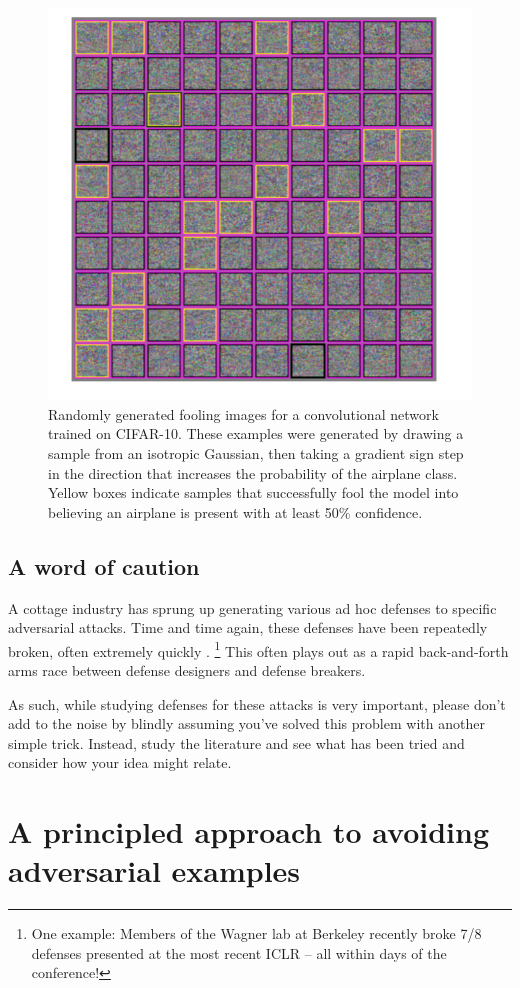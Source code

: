 \documentclass[10pt]{article}
\begin{document}
\begin{figure}[!h]
\centering
\includegraphics[width=0.5\linewidth]{modelsarewrong}
\caption{Randomly generated fooling images for a convolutional network trained on CIFAR-10. These examples were generated by drawing a sample from an isotropic Gaussian, then taking a gradient sign step in the direction that increases the probability of the airplane class. Yellow boxes indicate samples that successfully fool the model into believing an airplane is present with at least 50\% confidence.}
\label{fig:modelsarewrong}
\end{figure}

\subsection{A word of caution}

A cottage industry has sprung up generating various ad hoc defenses to specific adversarial attacks. Time and time again, these defenses have been repeatedly broken, often extremely quickly \cite{Athalye2018, Biggio2017}. \footnote{One example: Members of the Wagner lab at Berkeley recently broke 7/8 defenses presented at the most recent ICLR -- all within days of the conference!}  This often plays out as a rapid back-and-forth arms race between defense designers and defense breakers.

As such, while studying defenses for these attacks is very important, please don't add to the noise by blindly assuming you've solved this problem with another simple trick. Instead, study the literature and see what has been tried and consider how your idea might relate.


\section{A principled approach to avoiding adversarial examples}
\end{document}
